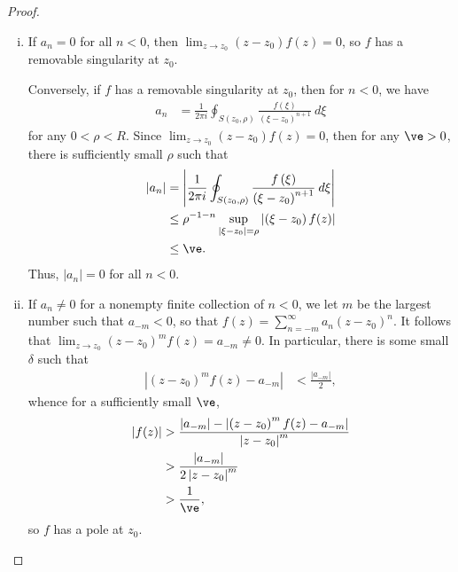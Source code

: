 \documentclass[10pt]{mypackage}
\begin{document}
\begin{proof}\hfill
  \begin{enumerate}[(i)]
    \item If $a_n = 0$ for all $n < 0$, then $\lim_{z\rightarrow z_0} \left( z-z_0 \right)f(z) = 0$, so $f$ has a removable singularity at $z_0$.\newline

      Conversely, if $f$ has a removable singularity at $z_0$, then for $n < 0$, we have
      \begin{align*}
        a_n &= \frac{1}{2\pi i} \oint_{S\left( z_0,\rho \right)}^{} \frac{f\left( \xi \right)}{\left( \xi - z_0 \right)^{n+1}}\:d\xi
      \end{align*}
      for any $0 < \rho < R$. Since $\lim_{z\rightarrow z_0}\left( z-z_0 \right)f(z) = 0$, then for any $\ve > 0$, there is sufficiently small $\rho$ such that
      \begin{align*}
        \left\vert a_n \right\vert &= \left\vert \frac{1}{2\pi i} \oint_{S\left( z_0,\rho \right)}^{} \frac{f\left( \xi \right)}{\left( \xi-z_0 \right)^{n+1}}\:d\xi \right\vert\\
                                   &\leq \rho^{-1-n} \sup_{\left\vert \xi-z_0 \right\vert = \rho}\left\vert \left( \xi-z_0 \right)f(z) \right\vert\\
                                   &\leq \ve.
      \end{align*}
      Thus, $\left\vert a_n \right\vert = 0$ for all $n < 0$.
    \item If $a_n\neq 0$ for a nonempty finite collection of $n < 0$, we let $m$ be the largest number such that $a_{-m} < 0$, so that $f(z) = \sum_{n=-m}^{\infty}a_n\left( z-z_0 \right)^{n}$. It follows that $\lim_{z\rightarrow z_0}\left( z-z_0 \right)^{m}f(z) = a_{-m}\neq 0$. In particular, there is some small $\delta$ such that
      \begin{align*}
        \left\vert \left( z-z_0 \right)^{m}f(z) - a_{-m} \right\vert &< \frac{\left\vert a_{-m} \right\vert}{2},
      \end{align*}
      whence for a sufficiently small $\ve$,
      \begin{align*}
        \left\vert f(z) \right\vert &> \frac{\left\vert a_{-m} \right\vert-\left\vert \left( z-z_0 \right)^{m}f(z)-a_{-m} \right\vert}{\left\vert z-z_0 \right\vert^{m}}\\
                                    &> \frac{\left\vert a_{-m} \right\vert}{2\left\vert z-z_0 \right\vert^{m}}\\
                                    &> \frac{1}{\ve},
      \end{align*}
      so $f$ has a pole at $z_0$.\newline


\end{enumerate}
\end{proof}
\end{document}
